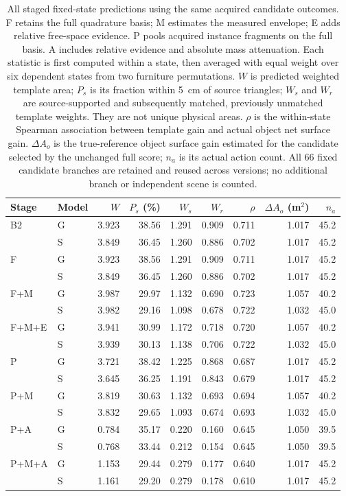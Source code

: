 \begin{table}[!htbp]
\centering\small\setlength{\tabcolsep}{3.2pt}
\caption{All staged fixed-state predictions using the same acquired candidate outcomes. F retains the full quadrature basis; M estimates the measured envelope; E adds relative free-space evidence. P pools acquired instance fragments on the full basis. A includes relative evidence and absolute mass attenuation. Each statistic is first computed within a state, then averaged with equal weight over six dependent states from two furniture permutations. $W$ is predicted weighted template area; $P_s$ is its fraction within 5~cm of source triangles; $W_s$ and $W_r$ are source-supported and subsequently matched, previously unmatched template weights. They are not unique physical areas. $\rho$ is the within-state Spearman association between template gain and actual object net surface gain. $\Delta A_o$ is the true-reference object surface gain estimated for the candidate selected by the unchanged full score; $n_a$ is its actual action count. All 66 fixed candidate branches are retained and reused across versions; no additional branch or independent scene is counted.}
\label{tab:staged-template-geometry}
\begin{tabular}{llrrrrrrr}
\toprule
Stage & Model & $W$ & $P_s$ (\%) & $W_s$ & $W_r$ & $\rho$ & $\Delta A_o$ (m$^2$) & $n_a$ \\
\midrule
B2 & G & 3.923 & 38.56 & 1.291 & 0.909 & 0.711 & 1.017 & 45.2 \\
 & S & 3.849 & 36.45 & 1.260 & 0.886 & 0.702 & 1.017 & 45.2 \\
\midrule
F & G & 3.923 & 38.56 & 1.291 & 0.909 & 0.711 & 1.017 & 45.2 \\
 & S & 3.849 & 36.45 & 1.260 & 0.886 & 0.702 & 1.017 & 45.2 \\
\midrule
F+M & G & 3.987 & 29.97 & 1.132 & 0.690 & 0.723 & 1.057 & 40.2 \\
 & S & 3.982 & 29.16 & 1.098 & 0.678 & 0.722 & 1.032 & 45.0 \\
\midrule
F+M+E & G & 3.941 & 30.99 & 1.172 & 0.718 & 0.720 & 1.057 & 40.2 \\
 & S & 3.939 & 30.13 & 1.138 & 0.706 & 0.722 & 1.032 & 45.0 \\
\midrule
P & G & 3.721 & 38.42 & 1.225 & 0.868 & 0.687 & 1.017 & 45.2 \\
 & S & 3.645 & 36.25 & 1.191 & 0.843 & 0.679 & 1.017 & 45.2 \\
\midrule
P+M & G & 3.819 & 30.63 & 1.132 & 0.693 & 0.694 & 1.057 & 40.2 \\
 & S & 3.832 & 29.65 & 1.093 & 0.674 & 0.693 & 1.032 & 45.0 \\
\midrule
P+A & G & 0.784 & 35.17 & 0.220 & 0.160 & 0.645 & 1.050 & 39.5 \\
 & S & 0.768 & 33.44 & 0.212 & 0.154 & 0.645 & 1.050 & 39.5 \\
\midrule
P+M+A & G & 1.153 & 29.44 & 0.279 & 0.177 & 0.640 & 1.017 & 45.2 \\
 & S & 1.161 & 29.20 & 0.279 & 0.178 & 0.610 & 1.017 & 45.2 \\
\bottomrule
\end{tabular}
\end{table}
